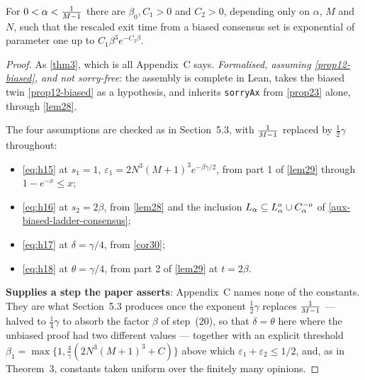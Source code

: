 \begin{theorem}
  \label{thm31}
  \leanok
  For $0 < \alpha < \tfrac{1}{M-1}$ there are $\beta_0, C_1 > 0$ and $C_2 > 0$,
  depending only on $\alpha$, $M$ and $N$, such that the rescaled exit time from
  a biased consensus set is exponential of parameter one up to
  $C_1 \beta^3 e^{-C_2\beta}$.
\end{theorem}
\begin{proof}
  \leanok
  As \ref{thm3}, which is all Appendix~C says. \emph{Formalised, assuming
  \ref{prop12-biased}, and not sorry-free}: the assembly is complete in Lean,
  takes the biased twin \ref{prop12-biased} as a hypothesis, and inherits
  \texttt{sorryAx} from \ref{prop23} alone, through \ref{lem28}.

  The four assumptions are checked as in Section~5.3, with $\tfrac{1}{M-1}$ replaced
  by $\tfrac{1}{2}\gamma$ throughout:
  \begin{itemize}
    \item \eqref{eq:h15} at $s_1 = 1$,
      $\varepsilon_1 = 2N^3(M+1)^3 e^{-\beta\gamma/2}$, from part 1 of
      \ref{lem29} through $1 - e^{-x} \le x$;
    \item \eqref{eq:h16} at $s_2 = 2\beta$, from
      \ref{lem28} and the inclusion $L_\alpha \subseteq L_\alpha^o
      \cup C_\alpha^{-o}$ of \ref{aux-biased-ladder-consensus};
    \item \eqref{eq:h17} at $\delta = \gamma/4$, from
      \ref{cor30};
    \item \eqref{eq:h18} at $\theta = \gamma/4$, from part 2 of
      \ref{lem29} at $t = 2\beta$.
  \end{itemize}

  \textbf{Supplies a step the paper asserts}: Appendix~C names none of the
  constants.  They are what Section~5.3 produces once the exponent
  $\tfrac{1}{2}\gamma$ replaces $\tfrac{1}{M-1}$ --- halved to $\tfrac{1}{4}\gamma$
  to absorb the factor $\beta$ of step~(20), so that $\delta = \theta$ here
  where the unbiased proof had two different values --- together with an
  explicit threshold $\beta_1 = \max\{1, \tfrac{4}{\gamma}(2N^3(M+1)^3 + C)\}$ above which
  $\varepsilon_1 + \varepsilon_2 \le 1/2$, and, as in Theorem~3, constants taken
  uniform over the finitely many opinions.
\end{proof}

